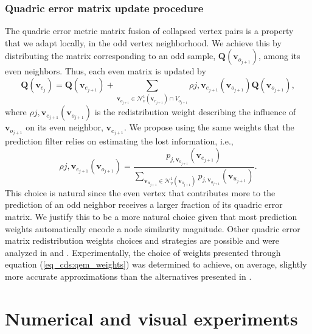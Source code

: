 \documentclass[graybox]{svmult}
\begin{document}
	\subsubsection{Quadric error matrix update procedure}
	The quadric error metric matrix fusion of collapsed vertex pairs is a property that we adapt locally, in the odd vertex neighborhood. We achieve this by distributing the matrix corresponding to an odd sample, $\mathbf{Q}({\mathbf{v}_{o_{j+1}}})$, among its even neighbors. Thus, each even matrix is updated by
	\begin{equation}
	\mathbf{Q}({\mathbf{v}_{e_j}}) = \mathbf{Q}({\mathbf{v}_{e_{j+1}}}) + \sum\limits_{\mathbf{v}_{o_{j+1}} \in \mathcal{N}^1_v(\mathbf{v}_{e_{j+1}}) \cap V_{o_{j+1}} } { \rho{j, \mathbf{v}_{e_{j+1}} }(  \mathbf{v}_{o_{j+1}}) \mathbf{Q}({ \mathbf{v}_{o_{j+1}}} )} ,
	\label{eq_cds:qem_update}
	\end{equation}
	where $\rho{j, \mathbf{v}_{e_{j+1}} }(  \mathbf{v}_{o_{j+1}})$ is the redistribution weight describing the influence of $ \mathbf{v}_{o_{j+1}}$ on its even neighbor, $\mathbf{v}_{e_{j+1}}$. We propose using the same weights that the prediction filter relies on estimating the lost information, i.e.,
	\begin{equation}
	\rho{j, \mathbf{v}_{e_{j+1}} }(  \mathbf{v}_{o_{j+1}}) =  \frac{p_{j, \mathbf{v}_{o_{j+1}} }(  \mathbf{v}_{e_{j+1}})}
	{ \sum_{\mathbf{v}_{u_{j+1}} \in \mathcal{N}^1_v(  \mathbf{v}_{o_{j+1}}) } { p_{j, \mathbf{v}_{o_{j+1}} }(  \mathbf{v}_{u_{j+1}}) }}.
	\label{eq_cds:qem_weights}
	\end{equation} 
	This choice is natural since the even vertex that contributes more to the prediction of an odd neighbor receives a larger fraction of its quadric error matrix. We justify this to be a more natural choice given that most prediction weights automatically encode a node similarity magnitude.
	Other quadric error matrix redistribution weights choices  and strategies are possible and were analyzed in \cite{Cioaca2015} and \cite{Cioaca2016UPB}. Experimentally, the choice of weights presented through equation (\ref{eq_cds:qem_weights}) was determined to achieve, on average, slightly more accurate approximations than the alternatives presented in \cite{Cioaca2016UPB}.
	
	
	\section{Numerical and visual experiments}
	
\end{document}
